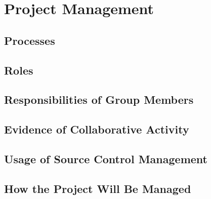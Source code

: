 \chapter{Project Management}

\section{Processes}
\section{Roles}
\section{Responsibilities of Group Members}
\section{Evidence of Collaborative Activity}
\section{Usage of Source Control Management}
\section{How the Project Will Be Managed}
